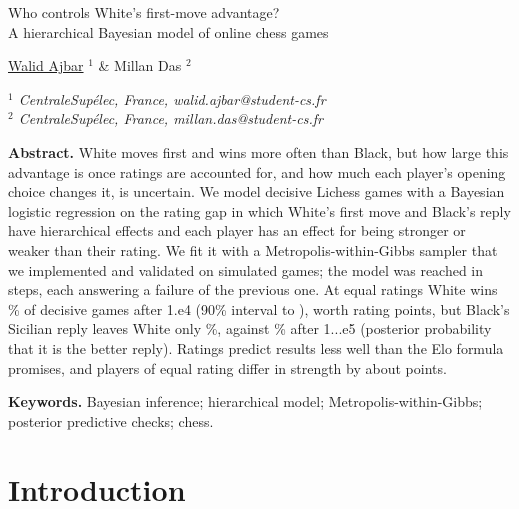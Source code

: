 \documentclass[12pt]{article}
\begin{document}

\begin{center}
{\Large
	{\sc Who controls White's first-move advantage?\\[2pt] A hierarchical Bayesian model of online chess games}
}
\bigskip

\underline{Walid Ajbar} $^{1}$ \& Millan Das $^{2}$
\bigskip

{\it
$^{1}$ CentraleSup\'elec, France, walid.ajbar@student-cs.fr\\
$^{2}$ CentraleSup\'elec, France, millan.das@student-cs.fr
}
\end{center}


{\bf Abstract.} White moves first and wins more often than Black, but how large this advantage is once ratings are accounted for, and how much each player's opening choice changes it, is uncertain. We model \nDecisive{} decisive Lichess games with a Bayesian logistic regression on the rating gap in which White's first move and Black's reply have hierarchical effects and each player has an effect for being stronger or weaker than their rating. We fit it with a Metropolis-within-Gibbs sampler that we implemented and validated on simulated games; the model was reached in steps, each answering a failure of the previous one. At equal ratings White wins \pWhiteEfour\% of decisive games after 1.e4 (90\% interval \pWhiteEfourLow{} to \pWhiteEfourHigh), worth \advantageEfour{} rating points, but Black's Sicilian reply leaves White only \pWhiteSicilian\%, against \pWhiteOpenGame\% after 1...e5 (posterior probability \probSicilian{} that it is the better reply). Ratings predict results less well than the Elo formula promises, and players of equal rating differ in strength by about \sigmaPlayerPoints{} points.

{\bf Keywords.} Bayesian inference; hierarchical model; Metropolis-within-Gibbs; posterior predictive checks; chess.

\section{Introduction}\label{sec:introduction}
\end{document}
